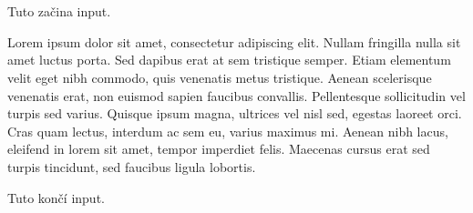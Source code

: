 \section{}
Tuto začina input.

Lorem ipsum dolor sit amet, consectetur adipiscing elit. Nullam fringilla nulla sit amet luctus porta. Sed dapibus erat at sem tristique semper. Etiam elementum velit eget nibh commodo, quis venenatis metus tristique. Aenean scelerisque venenatis erat, non euismod sapien faucibus convallis. Pellentesque sollicitudin vel turpis sed varius. Quisque ipsum magna, ultrices vel nisl sed, egestas laoreet orci. Cras quam lectus, interdum ac sem eu, varius maximus mi. Aenean nibh lacus, eleifend in lorem sit amet, tempor imperdiet felis. Maecenas cursus erat sed turpis tincidunt, sed faucibus ligula lobortis.

Tuto končí input.